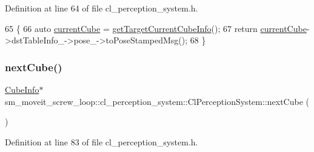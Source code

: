 Definition at line 64 of file cl\+\_\+perception\+\_\+system.\+h.


\begin{DoxyCode}
65             \{
66                 \textcolor{keyword}{auto} \hyperlink{classsm__moveit__screw__loop_1_1cl__perception__system_1_1ClPerceptionSystem_a21d95597754f74b644602b8697bb07dc}{currentCube} = \hyperlink{classsm__moveit__screw__loop_1_1cl__perception__system_1_1ClPerceptionSystem_ad9231b87b9592cc5c847ce1b92a75446}{getTargetCurrentCubeInfo}();
67                 \textcolor{keywordflow}{return} \hyperlink{classsm__moveit__screw__loop_1_1cl__perception__system_1_1ClPerceptionSystem_a21d95597754f74b644602b8697bb07dc}{currentCube}->dstTableInfo\_->pose\_->toPoseStampedMsg();
68             \}
\end{DoxyCode}
\mbox{\label{classsm__moveit__screw__loop_1_1cl__perception__system_1_1ClPerceptionSystem_a9f58986a4ad466ba1e5b46e9d4d971ac}} 
\subsubsection{\texorpdfstring{next\+Cube()}{nextCube()}}
{\footnotesize\ttfamily \hyperlink{structsm__moveit__screw__loop_1_1cl__perception__system_1_1CubeInfo}{Cube\+Info}$\ast$ sm\+\_\+moveit\+\_\+screw\+\_\+loop\+::cl\+\_\+perception\+\_\+system\+::\+Cl\+Perception\+System\+::next\+Cube (\begin{DoxyParamCaption}{ }\end{DoxyParamCaption})\hspace{0.3cm}{\ttfamily [inline]}}



Definition at line 83 of file cl\+\_\+perception\+\_\+system.\+h.


